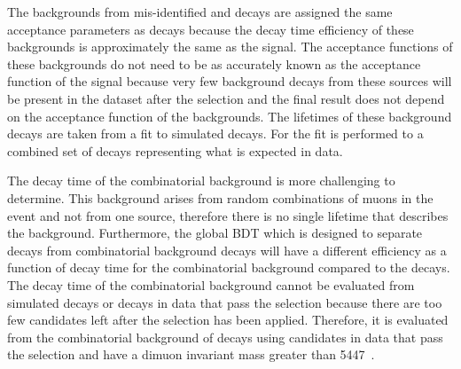 



The backgrounds from mis-identified and \bdmumu decays are assigned the same acceptance parameters as \bsmumu decays because the decay time efficiency of these backgrounds is approximately the same as the signal. The acceptance functions of these backgrounds do not need to be as accurately known as the acceptance function of the signal because very few background decays from these sources will be present in the dataset after the selection and the final result does not depend on the acceptance function of the backgrounds. The lifetimes of these background decays are taken from a fit to simulated decays. For \bhh the fit is performed to a combined set of \bhh decays representing what is expected in data. %

The decay time \pdf of the combinatorial background is more challenging to determine. This background arises from random combinations of muons in the event and not from one source, therefore there is no single lifetime that describes the background. Furthermore, the global BDT which is designed to separate \bsmumu decays from combinatorial background decays will have a different efficiency as a function of decay time for the combinatorial background compared to the \bsmumu decays. The decay time \pdf of the combinatorial background cannot be evaluated from simulated decays or decays in data that pass the \bsmumu selection because there are too few candidates left after the selection has been applied. %
Therefore, it is evaluated from the combinatorial background of \bhh decays using candidates in data that pass the \bhh selection and have a dimuon invariant mass greater than 5447~\mevcc. %

